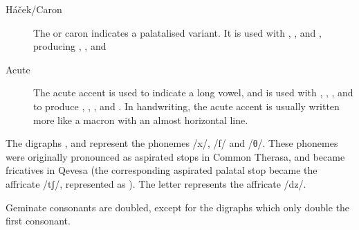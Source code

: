 \documentclass[grammar]{subfiles}
\begin{document}
\begin{description}
  \item[Háček/Caron] The  or caron indicates a palatalised
    variant.  It is used with , ,  and , producing ,
    ,  and   
  \item[Acute] The acute accent is used to indicate a long vowel, and is used
    with , , ,  and  to produce , , ,
     and .  In handwriting, the acute accent is usually written more
    like a macron with an almost horizontal line. 
\end{description}

The digraphs ,  and  represent the phonemes /x/, /f/ and /θ/.
These phonemes were originally pronounced as aspirated stops in Common Therasa,
and became fricatives in Qevesa (the corresponding aspirated palatal stop
became the affricate /tʃ/, represented as ).  The letter  represents
the affricate /dz/.

Geminate consonants are doubled, except for the digraphs which only double the
first consonant.  




%
%
%
%
%
%
%
\end{document}
